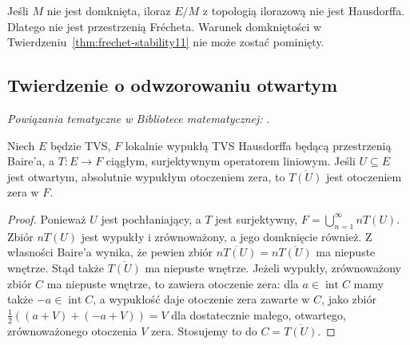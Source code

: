 \begin{uwaga}
Jeśli $M$ nie jest domknięta, iloraz $E/M$ z topologią
ilorazową nie jest Hausdorffa. Dlatego nie jest przestrzenią
Frécheta. Warunek domkniętości w Twierdzeniu~\ref{thm:frechet-stability11}
nie może zostać pominięty.
\end{uwaga}

\subsection{Twierdzenie o odwzorowaniu otwartym}

\noindent\emph{Powiązania tematyczne w Bibliotece matematycznej:} .


\begin{lemat}\label{lem:baire-open11}
Niech $E$ będzie TVS, $F$ lokalnie wypukłą TVS Hausdorffa
będącą przestrzenią Baire'a, a $T:E\to F$ ciągłym,
surjektywnym operatorem liniowym. Jeśli $U\subseteq E$
jest otwartym, absolutnie wypukłym otoczeniem zera, to
$\overline{T(U)}$ jest otoczeniem zera w $F$.
\end{lemat}
\begin{proof}
Ponieważ $U$ jest pochłaniający, a $T$ jest surjektywny,
$F=\bigcup_{n=1}^\infty nT(U)$. Zbiór $nT(U)$ jest
wypukły i zrównoważony, a jego domknięcie również.
Z własności Baire'a wynika, że pewien zbiór
$\overline{nT(U)}=n\overline{T(U)}$ ma niepuste wnętrze.
Stąd także $\overline{T(U)}$ ma niepuste wnętrze.
Jeżeli wypukły, zrównoważony zbiór $C$ ma niepuste wnętrze,
to zawiera otoczenie zera: dla $a\in\operatorname{int}C$
mamy także $-a\in\operatorname{int}C$, a wypukłość
daje otoczenie zera zawarte w $C$, jako zbiór
$\tfrac12((a+V)+(-a+V))=V$ dla dostatecznie małego,
otwartego, zrównoważonego otoczenia $V$ zera.
Stosujemy to do $C=\overline{T(U)}$.
\end{proof}

